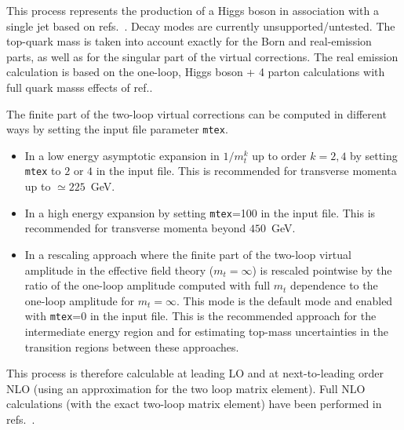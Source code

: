 \label{subsec:hjetma}
This process represents the production of a Higgs boson in association
with a single jet based on
refs.~\cite{Neumann:2016dny,Neumann:2018bsx,Ellis:1987xu,Baur:1989cm,Ellis:2018hst,Budge:2020oyl}.
Decay modes are currently unsupported/untested. The top-quark mass is taken
into account exactly for the Born and real-emission parts, as well as for the singular part of the virtual corrections.
The real emission calculation is based on the one-loop, Higgs boson + 4 parton calculations
with full quark masss effects of ref.\cite{Ellis:2018hst,Budge:2020oyl}.

The finite part of the two-loop virtual corrections can be computed in
different ways by setting the input file parameter {\tt mtex}.
\begin{itemize}
    \item In a low energy asymptotic expansion in $1/m_t^k$ up to
    order $k=2,4$ by setting {\tt mtex} to $2$ or $4$ in the input
    file. This is recommended for transverse momenta up to $\simeq
    225$~GeV.

\item In a high energy expansion by setting {\tt mtex}=100 in the input
    file. This is recommended for transverse momenta beyond $450$~GeV.

\item In a rescaling approach where the finite part of the two-loop virtual
     amplitude in the effective field theory
    ($m_t=\infty$) is rescaled pointwise by the ratio of the one-loop
    amplitude computed with full $m_t$ dependence to the one-loop
    amplitude for $m_t=\infty$. This mode is the default mode and
    enabled with {\tt mtex}=0 in the input file.  This is the
    recommended approach for the intermediate energy region and for
    estimating top-mass uncertainties in the transition regions
    between these approaches.

\end{itemize}

This process is therefore calculable at leading LO and at
next-to-leading order NLO (using an approximation for the two loop
matrix element). Full NLO calculations (with the exact two-loop matrix
element) have been performed in refs.~\cite{Jones:2018hbb,Chen:2021azt,Bonciani:2022jmb}.

